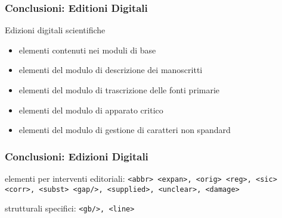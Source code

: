 \begin{frame}
    \frametitle{Conclusioni: Editioni Digitali}
    \addtocounter{nframe}{1}
    

    \begin{block}{Edizioni digitali scientifiche}
        \begin{itemize}
            \item elementi contenuti nei moduli di base
            \item elementi del modulo di descrizione dei manoscritti
            \item elementi del modulo di trascrizione delle fonti primarie
            \item elementi del modulo di apparato critico
            \item elementi del modulo di gestione di caratteri non spandard
        \end{itemize}
    \end{block}
    
\end{frame}


\begin{frame}
    \frametitle{Conclusioni: Edizioni Digitali}
    \addtocounter{nframe}{1}
    

    \begin{block}{elementi per interventi editoriali:}
        \texttt{<abbr> <expan>, <orig> <reg>, <sic> <corr>, <subst>
        <gap/>, <supplied>, <unclear>, <damage>}
    \end{block}

    \begin{block}{strutturali specifici:}
        \texttt{<gb/>, <line>}
    \end{block}
    
\end{frame}


